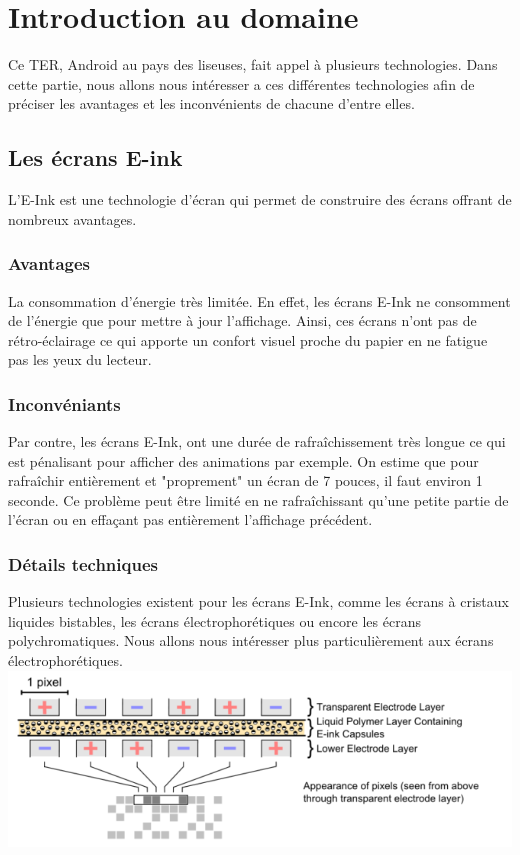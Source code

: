 \chapter{Introduction au domaine}
Ce TER, Android au pays des liseuses, fait appel à plusieurs technologies. Dans cette partie, nous allons nous intéresser a ces différentes technologies afin de préciser les avantages et les inconvénients de chacune d'entre elles.
\section{Les écrans E-ink}
L'E-Ink est une technologie d'écran qui permet de construire des écrans offrant de nombreux avantages.
\subsection{Avantages}
La consommation d'énergie très limitée. En effet, les écrans E-Ink ne consomment de l'énergie que pour mettre à jour l'affichage. Ainsi, ces écrans n'ont pas de rétro-éclairage ce qui apporte un confort visuel proche du papier en ne fatigue pas les yeux du lecteur. 
\subsection{Inconvéniants}
Par contre, les écrans E-Ink, ont une durée de rafraîchissement très longue ce qui est pénalisant pour afficher des animations par exemple. On estime que pour rafraîchir entièrement et "proprement" un écran de 7 pouces, il faut environ 1 seconde. Ce problème peut être limité en ne rafraîchissant qu'une petite partie de l'écran ou en effaçant pas entièrement l'affichage précédent. 
\subsection{Détails techniques}
Plusieurs technologies existent pour les écrans E-Ink, comme les écrans à cristaux liquides bistables, les écrans électrophorétiques ou encore les écrans polychromatiques. Nous allons nous intéresser plus particulièrement aux écrans électrophorétiques.\\
\includegraphics{Electrophoretic.png}
